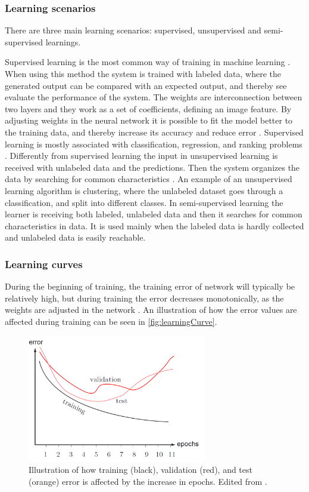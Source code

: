 \subsubsection{Learning scenarios}
There are three main learning scenarios: supervised, unsupervised and semi-supervised learnings.

Supervised learning is the most common way of training in machine learning \citep{LeCun2015}. When using this method the system is trained with labeled data, where the generated output can be compared with an expected output, and thereby see evaluate the performance of the system. The weights are interconnection between two layers and they work as a set of coefficients, defining an image feature.\citep{Hameed2016} By adjusting weights in the neural network it is possible to fit the model better to the training data, and thereby increase its accuracy and reduce error \citep{LeCun2015}. Supervised learning is mostly associated with classification, regression, and ranking problems \citep{Mehryar2012}.
\noindent
Differently from supervised learning the input in unsupervised learning is received with unlabeled data and the predictions. Then the system organizes the data by searching for common characteristics \citep{Mehryar2012}. An example of an unsupervised learning algorithm is clustering, where the unlabeled dataset goes through a classification, and split into different classes.\citep{Goodfellow2016} 
\noindent
In semi-supervised learning the learner is receiving both labeled, unlabeled data and then it searches for common characteristics in data. It is used mainly when the labeled data is hardly collected and unlabeled data is easily reachable.\citep{Mehryar2012}


\subsubsection{Learning curves}
During the beginning of training, the training error of network will typically be relatively high, but during training the error decreases monotonically, as the weights are adjusted in the network \citep{Duda2000}. An illustration of how the error values are affected during training can be seen in \autoref{fig:learningCurve}.

\begin{figure} [H]
\centering
\includegraphics[width=0.7\textwidth]{figures/learningCurves}
\caption{Illustration of how training (black), validation (red), and test (orange) error is affected by the increase in epochs. Edited from \citep{Duda2000}.}
\label{fig:learningCurve}
\end{figure}

